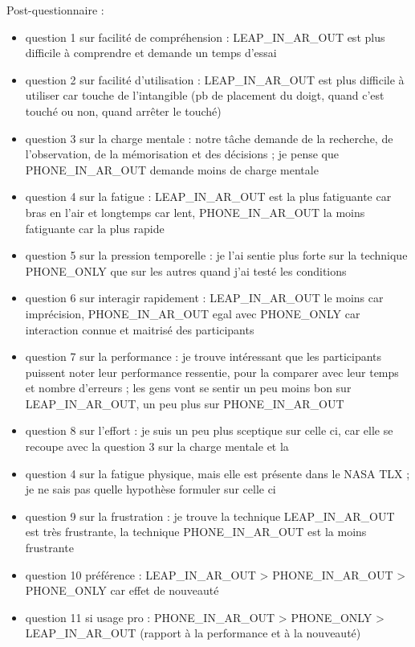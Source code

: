 Post-questionnaire :
\begin{itemize}
  \item question 1 sur facilité de compréhension : LEAP_IN_AR_OUT est plus difficile à comprendre et demande un temps d'essai
  \item question 2 sur facilité d'utilisation : LEAP_IN_AR_OUT est plus difficile à utiliser car touche de l'intangible (pb de placement du doigt, quand c'est touché ou non, quand arrêter le touché)
  \item question 3 sur la charge mentale : notre tâche demande de la recherche, de l'observation, de la mémorisation et des décisions ; je pense que PHONE_IN_AR_OUT demande moins de charge mentale
  \item question 4 sur la fatigue : LEAP_IN_AR_OUT est la plus fatiguante car bras en l'air et longtemps car lent, PHONE_IN_AR_OUT la moins fatiguante car la plus rapide
  \item question 5 sur la pression temporelle : je l'ai sentie plus forte sur la technique PHONE_ONLY que sur les autres quand j'ai testé les conditions
  \item question 6 sur interagir rapidement : LEAP_IN_AR_OUT le moins car imprécision, PHONE_IN_AR_OUT egal avec PHONE_ONLY car interaction connue et maitrisé des participants
  \item question 7 sur la performance : je trouve intéressant que les participants puissent noter leur performance ressentie, pour la comparer avec leur temps et nombre d'erreurs ; les gens vont se sentir un peu moins bon sur LEAP_IN_AR_OUT, un peu plus sur PHONE_IN_AR_OUT
  \item question 8 sur l'effort : je suis un peu plus sceptique sur celle ci, car elle se recoupe avec la question 3 sur la charge mentale et la \item question 4 sur la fatigue physique, mais elle est présente dans le NASA TLX ; je ne sais pas quelle hypothèse formuler sur celle ci
  \item question 9 sur la frustration : je trouve la technique LEAP_IN_AR_OUT est très frustrante, la technique PHONE_IN_AR_OUT est la moins frustrante
  \item question 10 préférence : LEAP_IN_AR_OUT > PHONE_IN_AR_OUT > PHONE_ONLY car effet de nouveauté
  \item question 11 si usage pro : PHONE_IN_AR_OUT > PHONE_ONLY > LEAP_IN_AR_OUT (rapport à la performance et à la nouveauté)
\end{itemize}


